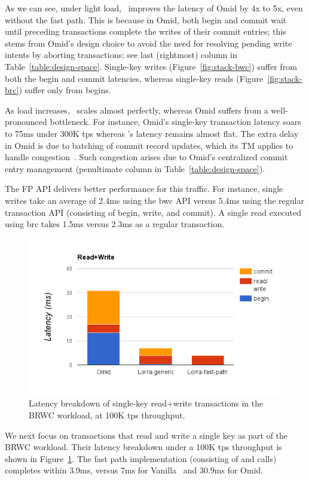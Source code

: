 As we can see, under light load, \sys\ improves the latency of Omid by 4x to 5x, even without the fast path.
This is because in Omid, both begin and commit wait until preceding transactions complete the writes of 
their commit entries; this stems from Omid's design choice to avoid the need for resolving pending write intents
by aborting transactions; see last (rightmost) column in Table~\ref{table:design-space}. 
Single-key writes (Figure~\ref{fig:stack-bwc})
suffer from both the begin and commit latencies, whereas single-key reads (Figure~\ref{fig:stack-brc}) 
suffer only from begins. 

As load increases, \sys\ scales almost perfectly, whereas Omid suffers from a well-pronounced 
bottleneck. For instance, Omid's single-key transaction latency soars to 75ms under 300K tps whereas
{\sys}'s latency remains almost flat. The extra delay in Omid is due to batching of commit record updates, 
which its TM applies to handle congestion~\cite{Omid2017}. Such congestion arises due to Omid's centralized 
commit entry management (penultimate column in Table~\ref{table:design-space}).

The FP API delivers better performance for this traffic. For instance, single writes take an average of 2.4ms using 
the {\code bwc} API versus 5.4ms using the regular transaction API (consisting of begin, write, and commit). 
A single read executed using {\code brc} takes 1.5ms versus 2.3ms as a regular transaction. 

\begin{figure}[htb]
\includegraphics[width=.45\textwidth]{figs/stack-br-wc.png}
\caption{Latency breakdown of single-key read+write transactions in the BRWC workload,
at 100K tps throughput.}
\label{fig:rmw}
\end{figure}

We next focus on transactions that read and write a single key as part of the BRWC workload. 
Their latency breakdown under a 100K tps throughput is shown in Figure~\ref{fig:rmw}.
The fast path implementation (consisting of  and  calls) completes within 3.9ms,
versus 7ms for Vanilla \sys\ and 30.9ms for Omid. 


